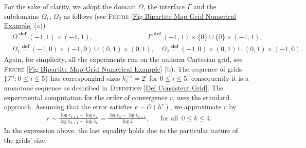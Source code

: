 \documentclass[3p]{elsarticle}
\def\defining{\overset{\mathbf{def}} =}
\def\triang{\mathcal{T}}
\begin{document}
\newline
\newline
For the sake of clarity, we adopt the domain $\Omega$, the interface $\Gamma$ and the subdomains $\Omega_{1}$, $\Omega_{2}$ as follows (see \textsc{Figure} \ref{Fig Bipartite Map Grid Numerical Example} (a))  
%
%
\begin{equation}\label{Def Geometric Parameters}
%
\begin{split} 
& \Omega \defining (-1,1) \times (-1,1) , 
\qquad \qquad\qquad \quad\quad
 \Gamma \defining (-1,1) \times \{0\} \cup  \{0\} \times  (-1, 1) , \\
%
& \Omega_{1} \defining (-1,0) \times  (-1, 0) \cup  (0, 1) \times  (0, 1)  ,\quad
\Omega_{2} \defining  (-1, 0) \times (0, 1)\cup  (0, 1) \times  (-1, 0) .
\end{split}
%
\end{equation}
%
%
Again, for simplicity, all the experiments run on the uniform Cartesian grid, see \textsc{Figure} \ref{Fig Bipartite Map Grid Numerical Example} (b). The sequence of grids $\{\triang^{i}: 0\leq i\leq 5 \}$ has correspongind sizes $ h_{i}^{-1} = 2^{i} $ for $0 \leq i \leq 5$; consequently it is a monotone sequence as described in \textsc{Definition} \ref{Def Consistent Grid}. The experimental computation for the order of convergence $r$, uses the standard approach. Assuming that the error satisfies $e = \mathcal{O}(h^{r})$, we approximate $r$ by
%
%
\begin{align*} %
& r \sim \frac{\log e_{k + 1} - \log e_{k}}{\log h_{k + 1} - \log h_{k} } 
=  \frac{\log e_{k} - \log e_{k + 1}}{\log 2 } ,&
& \text{for all }\, 0\leq k \leq 4 .
\end{align*}
%
%
In the expression above, the last equality holds due to the particular nature of the grids' size. 
%
%
\end{document}
